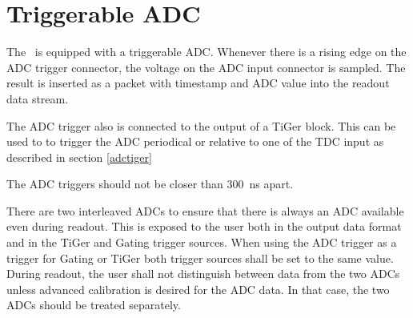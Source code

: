 {	\section{Triggerable ADC}
		\label{adc}
		The \deviceName\ is equipped with a triggerable ADC. 
		Whenever there is a rising edge on the ADC trigger connector, 
		the voltage on the ADC input connector is sampled. 
		The result is inserted as a packet with timestamp and ADC value into the readout data stream.

		The ADC trigger also is connected to the output of a TiGer block. 
		This can be used to to trigger the ADC periodical or relative to one of the TDC input as described in section \ref{adctiger}

		The ADC triggers should not be closer than 300~ns apart.

		There are two interleaved ADCs  to ensure that there is always an ADC available even during readout. 
		This is exposed to the user both in the output data format and in the TiGer and Gating trigger sources.
		When using the ADC trigger as a trigger for Gating or TiGer both trigger sources shall be set to the same value.
		During readout, the user shall not distinguish between data from the two ADCs unless advanced calibration is 
		desired for the ADC data. In that case, the two ADCs should be treated separately.   

}{}